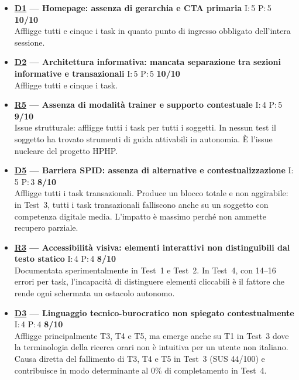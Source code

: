 \documentclass[11pt,a4paper]{article}
\begin{document}
\begin{tcolorbox}[colback=backgroundColor,colframe=borderColor,arc=2mm]
\begin{itemize}[leftmargin=*,itemsep=8pt]

    \item \textbf{\hyperref[iss:D1]{D1} --- Homepage: assenza di gerarchia 
    e CTA primaria}
    \hfill I:\,5 \textbar{} P:\,5 \textbar{} \textbf{10/10}\\
    Affligge tutti e cinque i task in quanto punto di ingresso obbligato 
    dell'intera sessione. 

    \item \textbf{\hyperref[iss:D2]{D2} --- Architettura informativa: 
    mancata separazione tra sezioni informative e transazionali}
    \hfill I:\,5 \textbar{} P:\,5 \textbar{} \textbf{10/10}\\
    Affligge tutti e cinque i task.

    \item \textbf{\hyperref[iss:R5]{R5} --- Assenza di modalità trainer 
    e supporto contestuale}
    \hfill I:\,4 \textbar{} P:\,5 \textbar{} \textbf{9/10}\\
    Issue strutturale: affligge tutti i task per tutti i soggetti. 
    In nessun test il soggetto ha trovato strumenti di guida attivabili 
    in autonomia. È l'issue nucleare del 
    progetto HPHP.

    \item \textbf{\hyperref[iss:D5]{D5} --- Barriera SPID: 
    assenza di alternative e contestualizzazione}
    \hfill I:\,5 \textbar{} P:\,3 \textbar{} \textbf{8/10}\\
    Affligge tutti i task transazionali. Produce un blocco 
    totale e non aggirabile: in Test~3, tutti i task transazionali 
    falliscono anche su un soggetto con competenza digitale media. 
    L'impatto è massimo perché non ammette recupero parziale.

    \item \textbf{\hyperref[iss:R3]{R3} --- Accessibilità visiva: 
    elementi interattivi non distinguibili dal testo statico}
    \hfill I:\,4 \textbar{} P:\,4 \textbar{} \textbf{8/10}\\
    Documentata sperimentalmente in Test~1 e Test~2. 
    In Test~4, con 14--16 errori per task, l'incapacità di distinguere 
    elementi cliccabili è il fattore che rende ogni schermata un ostacolo 
    autonomo.

    \item \textbf{\hyperref[iss:D3]{D3} --- Linguaggio tecnico-burocratico 
    non spiegato contestualmente}
    \hfill I:\,4 \textbar{} P:\,4 \textbar{} \textbf{8/10}\\
    Affligge principalmente T3, T4 e T5, ma emerge anche su T1 in Test~3 
    dove la terminologia della ricerca orari non è intuitiva per un utente 
    non italiano. Causa diretta del fallimento di T3, T4 e T5 in Test~3 
    (SUS 44/100) e contribuisce in modo determinante al 0\% di 
    completamento in Test~4.


\end{itemize}
\end{tcolorbox}
\end{document}
